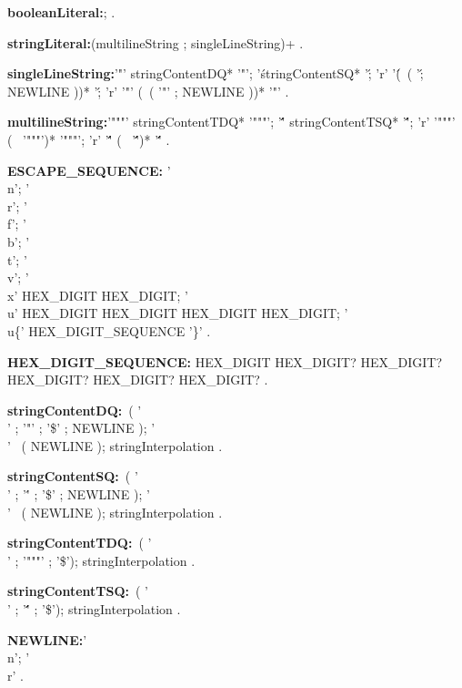 \begin{grammar}
{\bf booleanLiteral:}\TRUE{};
        \FALSE{}
    .
\end{grammar}
\begin{grammar}
{\bf stringLiteral:}(multilineString ; singleLineString)+
    .
\end{grammar}
\begin{grammar}
 {\bf singleLineString:}'"' stringContentDQ* '"';
       '\' stringContentSQ* '\';
      'r' '\' (~( '\' ; NEWLINE ))* '\';
      'r' '"' (~( '"' ; NEWLINE ))* '"'
    .
\end{grammar}
\begin{grammar}
 {\bf multilineString:}'"""' stringContentTDQ*   '"""';
      '\'\'\'' stringContentTSQ* '\'\'\'';
      'r' '"""'  (~ '"""')*   '"""';
      'r' '\'\'\'' (~ '\'\'\'')* '\'\'\''
    .
    
    
    {\bf ESCAPE_SEQUENCE:} '\\n';
    '\\r';
   '\\f';
   '\\b';
  '\\t';
   '\\v';
  '\\x' HEX_DIGIT HEX_DIGIT;
   '\\u' HEX_DIGIT HEX_DIGIT HEX_DIGIT HEX_DIGIT;
   '\\u\{' HEX_DIGIT_SEQUENCE '\}'
  .
  
{\bf HEX_DIGIT_SEQUENCE:}
     HEX_DIGIT HEX_DIGIT? HEX_DIGIT? HEX_DIGIT? HEX_DIGIT? HEX_DIGIT? 
    .
   
\end{grammar}
\begin{grammar}
 {\bf stringContentDQ:}~( '\\' ; '"' ; '\$' ; NEWLINE );
      '\\'  ~( NEWLINE );
     stringInterpolation
    .

 {\bf stringContentSQ:}~( '\\' ; '\'' ; '\$' ; NEWLINE );
      '\\'  ~( NEWLINE );
     stringInterpolation
    .

    
 {\bf stringContentTDQ:}~( '\\' ;  '"""' ; '\$');
     stringInterpolation
    .    

 {\bf stringContentTSQ:}~( '\\' ; '\'\'\'' ; '\$');
     stringInterpolation
    .
    
{\bf NEWLINE:}'\\n';
      '\\r'
    .

 \end{grammar}
